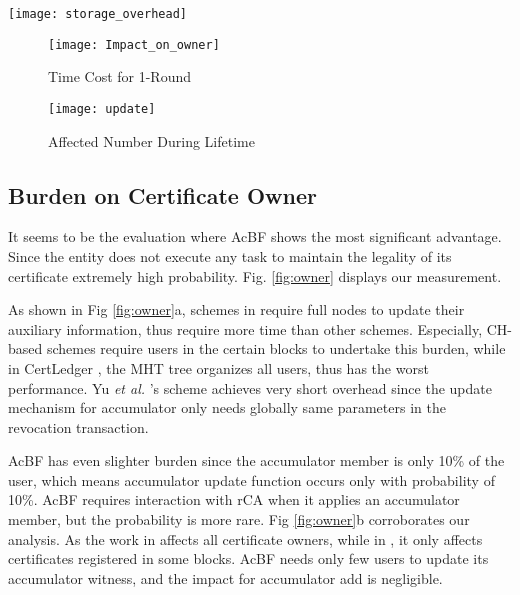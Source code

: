 \documentclass[conference]{IEEEtran}
\begin{document}
 \begin{figure*}[!htb]
    \centering
    \begin{minipage}{.35\textwidth}
        \centering
        \texttt{[image: storage\_overhead]}
        \caption{Storage on Verifier for Revocation}
        \label{fig:withBF}
    \end{minipage}%
    \begin{minipage}{0.64\textwidth}
		\begin{subfigure}[b]{0.49\textwidth}
			\centering
			\texttt{[image: Impact\_on\_owner]}
			\caption{Time Cost for 1-Round}
			\label{fig:owner_time}
		\end{subfigure}
		\begin{subfigure}[b]{0.49\textwidth}
			\centering
			\texttt{[image: update]}
			\caption{Affected Number During Lifetime}
			\label{fig:owner_number}
		\end{subfigure}
        \caption{Evaluation Result on Owners' Reaction for Revocation}
        \label{fig:owner}	
    \end{minipage}
\end{figure*}

\subsection{Burden on Certificate Owner}

It seems to be the evaluation where AcBF shows the most significant advantage. Since the entity does not execute any task to maintain the legality of its certificate extremely high probability. Fig. \ref{fig:owner} displays our measurement.

As shown in Fig \ref{fig:owner}a, schemes in \cite{luoScalaCertScalabilityOrientedPKI2022a,certledger, jia2021process} require full nodes to update their auxiliary information, thus require more time than other schemes. Especially, CH-based schemes require users in the certain blocks to undertake this burden, while in CertLedger \cite{certledger}, the MHT tree organizes all users, thus has the worst performance. Yu \textit{et al.} \cite{yu2019blockchain}'s scheme achieves very short overhead since the update mechanism for accumulator only needs globally same parameters in the revocation transaction. 

AcBF has even slighter burden since the accumulator member is only 10\% of the user, which means accumulator update function occurs only with probability of 10\%. AcBF requires interaction with rCA when it applies an accumulator member, but the probability is more rare. Fig \ref{fig:owner}b corroborates our analysis. As the work in \cite{yu2019blockchain} affects all certificate owners, while in \cite{luoScalaCertScalabilityOrientedPKI2022a,jia2021process}, it only affects certificates registered in some blocks. AcBF needs only few users to update its accumulator witness, and the impact for accumulator add is negligible. 
\end{document}
